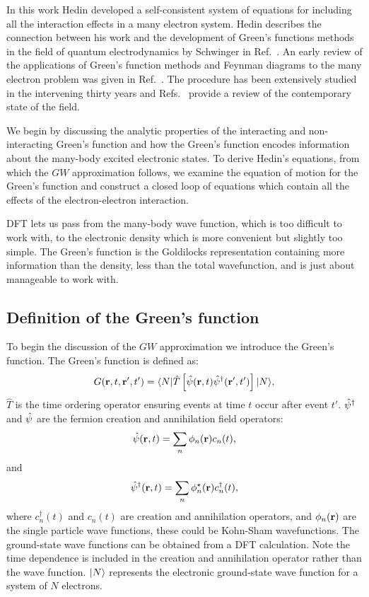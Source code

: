In this work Hedin developed a
self-consistent system of equations for including all the interaction effects
in a many electron system. Hedin describes the
connection between his work and the development of Green's
functions methods in the field of quantum electrodynamics by Schwinger in Ref.~\cite{schwinger51}.
An early review of the applications of Green's function methods and
Feynman diagrams to the many electron problem was given in Ref.~\cite{pratt63}. 
The procedure has been extensively studied in the 
intervening thirty years and Refs.~\cite{aulbur00, aryasetgunnarsson98, onida02}
provide a review of the contemporary state of the field.

We begin by discussing the analytic properties of the interacting and
non-interacting Green's function and how the Green's function encodes information about
the many-body excited electronic states. To derive Hedin's equations, from which
the $GW$ approximation follows, we examine the equation of motion for the Green's function and
construct a closed loop of equations which contain all the effects of the
electron-electron interaction. 

DFT lets us pass from the many-body wave function, which is too difficult to work with,
to the electronic density which is more convenient but slightly too simple. The Green's
function is the Goldilocks representation containing more information than the density,
less than the total wavefunction, and is just about manageable to work with.

\subsection{Definition of the Green's function}
\label{subsec:defgreenfun}
To begin the discussion of the $GW$ approximation we introduce the Green's function. 
The Green's function is defined as:
%
\begin{equation}
\label{eq:green0}
G({\bf r},t,{\bf r^\prime},t') = \langle N|\hat{T}\left[\hat{\psi}({\bf r},t)\hat{\psi}^{\dagger}({\bf r^\prime},t')\right]|N \rangle,
\end{equation}
%
$\hat{T}$ is the time ordering operator ensuring events at time $t$ occur
after event $t'$. $\hat{\psi}^{\dagger}$ and $\hat{\psi}$ are the fermion 
creation and annihilation field operators:
%
\begin{equation}
\hat{\psi}({\bf r},t) = \sum_{n} \phi_{n}({\bf r}) c_{n}(t),
\end{equation}
%
and 
%
\begin{equation}
\hat{\psi}^{\dagger}({\bf r},t) = \sum_{n} \phi^{\star}_{n}({\bf r}) c^{\dagger}_{n}(t),
\end{equation}
%
where $c^{\dagger}_{n}(t)$ and $c_{n}(t)$ are creation 
and annihilation operators, and $\phi_{n}({\bf r})$ are 
the single particle wave functions, these could be Kohn-Sham wavefunctions. 
The ground-state wave functions can be obtained from a DFT calculation. 
Note the time dependence is included in the creation and 
annihilation operator rather than the wave function. $|N\rangle$ represents 
the electronic ground-state wave function for a system of $N$ electrons.

